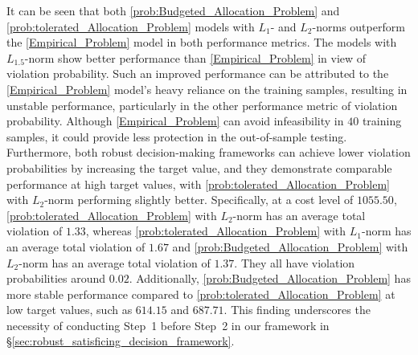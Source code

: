 \documentclass[opre, nonblindrev]{informswp}
\newcommand{\1}[1]{\mathds{1}{\left(#1\right)}}
\begin{document}
It can be seen that both \ref{prob:Budgeted_Allocation_Problem} and \ref{prob:tolerated_Allocation_Problem} models with $L_1$- and $L_2$-norms outperform the \ref{Empirical_Problem} model in both performance metrics. The models with $L_{1.5}$-norm show better performance than \ref{Empirical_Problem} in view of violation probability. Such an improved performance can be attributed to the \ref{Empirical_Problem} model's heavy reliance on the training samples, resulting in unstable performance, particularly in the other performance metric of violation probability. Although \ref{Empirical_Problem} can avoid infeasibility in $40$ training samples, it could provide less protection in the out-of-sample testing. Furthermore, both robust decision-making frameworks can achieve lower violation probabilities by increasing the target value, and they demonstrate comparable performance at high target values, with \ref{prob:tolerated_Allocation_Problem} with $L_2$-norm performing slightly better. Specifically, at a cost level of $1055.50$,
\ref{prob:tolerated_Allocation_Problem} with $L_2$-norm has an average total violation of $1.33$, whereas \ref{prob:tolerated_Allocation_Problem} with $L_1$-norm has an average total violation of $1.67$ and \ref{prob:Budgeted_Allocation_Problem} with $L_2$-norm has an average total violation of $1.37$. They all have violation probabilities around $0.02$.
Additionally, \ref{prob:Budgeted_Allocation_Problem} has more stable performance compared to \ref{prob:tolerated_Allocation_Problem} at low target values, such as $614.15$ and $687.71$. This finding underscores the necessity of conducting Step~1 before Step~2 in our framework in \S \ref{sec:robust_satisficing_decision_framework}.
\end{document}
